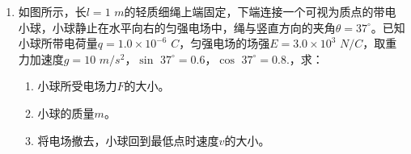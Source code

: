 \begin{enumerate}[leftmargin=0em]
\item
{}
如图所示，长$ l=1 $ $ m $的轻质细绳上端固定，下端连接一个可视为质点的带电小球，小球静止在水平向右的匀强电场中，绳与竖直方向的夹角$ \theta =37 ^{ \circ } $。已知小球所带电荷量$ q=1.0 \times 10 ^{-6} $ $ C $，匀强电场的场强$ E=3.0 \times 10^3 $ $ N/C $，取重力加速度$ g=10 $ $ m/s ^{2} $，$ \sin $ $ 37 ^{ \circ } =0.6 $，$ \cos $ $ 37 ^{ \circ } =0.8 $.，求：
\begin{minipage}[h!]{0.7\linewidth}
\vspace{0.3em}
\begin{enumerate}
\renewcommand{\labelenumi}{\arabic{enumi}.}
\item
小球所受电场力$ F $的大小。
\item 
小球的质量$ m $。
\item 
将电场撤去，小球回到最低点时速度$ v $的大小。



\end{enumerate}
\vspace{0.3em}
\end{minipage}
\hfill
\begin{minipage}[h!]{0.3\linewidth}
\flushright
\vspace{0.3em}

\vspace{0.3em}
\end{minipage}









\end{enumerate}
